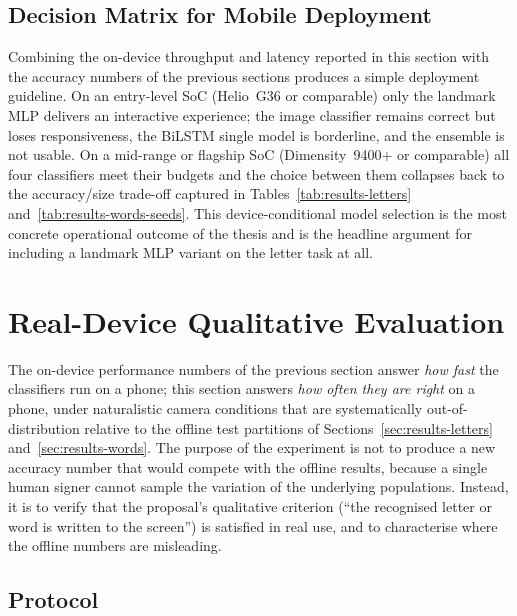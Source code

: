 \subsection{Decision Matrix for Mobile Deployment}
\label{sec:results-on-device-matrix}

Combining the on-device throughput and latency reported in this
section with the accuracy numbers of the previous sections produces
a simple deployment guideline. On an entry-level SoC (Helio~G36 or
comparable) only the landmark MLP delivers an interactive
experience; the image classifier remains correct but loses
responsiveness, the BiLSTM single model is borderline, and the
ensemble is not usable. On a mid-range or flagship SoC
(Dimensity~9400+ or comparable) all four classifiers meet their
budgets and the choice between them collapses back to the
accuracy/size trade-off captured in
Tables~\ref{tab:results-letters} and~\ref{tab:results-words-seeds}.
This device-conditional model selection is the most concrete
operational outcome of the thesis and is the headline argument for
including a landmark MLP variant on the letter task at all.

\section{Real-Device Qualitative Evaluation}
\label{sec:results-qualitative}

The on-device performance numbers of the previous section answer
\emph{how fast} the classifiers run on a phone; this section answers
\emph{how often they are right} on a phone, under naturalistic
camera conditions that are systematically out-of-distribution
relative to the offline test partitions of
Sections~\ref{sec:results-letters} and~\ref{sec:results-words}. The
purpose of the experiment is not to produce a new accuracy number
that would compete with the offline results, because a single human
signer cannot sample the variation of the underlying populations.
Instead, it is to verify that the proposal's qualitative criterion
(``the recognised letter or word is written to the screen'') is
satisfied in real use, and to characterise where the offline numbers
are misleading.

\subsection{Protocol}
\label{sec:results-qualitative-protocol}

